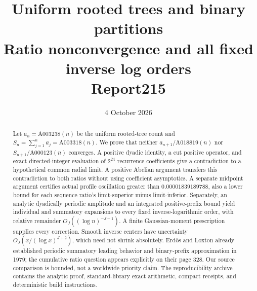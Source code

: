 \documentclass[11pt,letterpaper]{article}
\title{\textbf{Uniform rooted trees and binary partitions}\\[6pt]\large Ratio nonconvergence and all fixed inverse log orders\\[4pt]Report215}
\author{}\date{4 October 2026}
\theoremstyle{remark}\newtheorem{remark}[theorem]{Remark}
\begin{document}
\maketitle\thispagestyle{fancy}
\begin{abstract}
Let $a_n=\mathrm{A003238}(n)$ be the uniform rooted-tree count and $S_n=\sum_{j=1}^n a_j=\mathrm{A003318}(n)$. We prove that neither $a_{n+1}/\mathrm{A018819}(n)$ nor $S_{n+1}/\mathrm{A000123}(n)$ converges. A positive dyadic identity, a cut positive operator, and exact directed-integer evaluation of $2^{24}$ recurrence coefficients give a contradiction to a hypothetical common radial limit. A positive Abelian argument transfers this contradiction to both ratios without using coefficient asymptotics. A separate midpoint argument certifies actual profile oscillation greater than $0.00001839189788$, also a lower bound for each sequence ratio's limit-superior minus limit-inferior. Separately, an analytic dyadically periodic amplitude and an integrated positive-prefix bound yield individual and summatory expansions to every fixed inverse-logarithmic order, with relative remainder $O_J((\log n)^{-J-1})$. A finite Gaussian-moment prescription supplies every correction. Smooth inverse centers have uncertainty $O_J(x/(\log x)^{J+2})$, which need not shrink absolutely. Erd\H{o}s and Loxton already established periodic summatory leading behavior and binary-prefix approximation in 1979; the cumulative ratio question appears explicitly on their page 328. Our source comparison is bounded, not a worldwide priority claim. The reproducibility archive contains the analytic proof, standard-library exact arithmetic, compact receipts, and deterministic build instructions.
\end{abstract}
\end{document}

